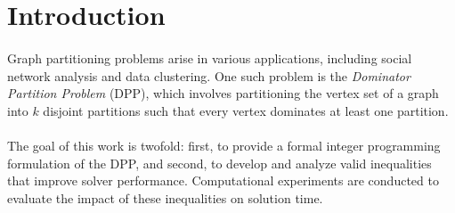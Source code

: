 \section{Introduction}
\label{sec:introduction}


\paragraph{} Graph partitioning problems arise in various applications, including social network analysis and data clustering. One such problem is the \textit{Dominator Partition Problem} (DPP), which involves partitioning the vertex set of a graph into $k$ disjoint partitions such that every vertex dominates at least one partition.

\paragraph{} The goal of this work is twofold: first, to provide a formal integer programming formulation of the DPP, and second, to develop and analyze valid inequalities that improve solver performance. Computational experiments are conducted to evaluate the impact of these inequalities on solution time.
